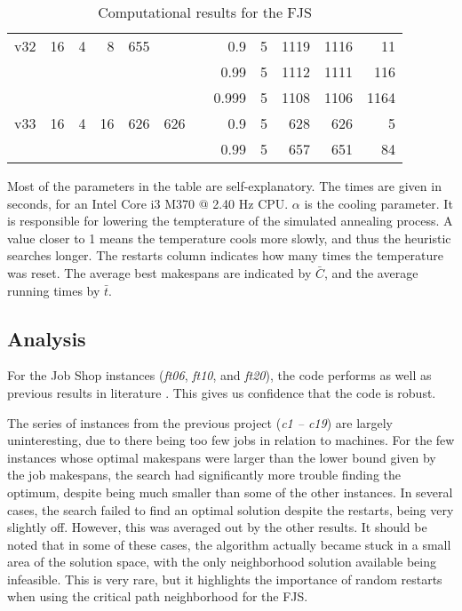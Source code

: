 \documentclass[a4paper,11pt]{article}
\begin{document}
\begin{table}
\begin{tabular}{@{\bfseries}rrrrrrrrrrrr}
	v32  & 16 &  4 &  8 &  655 &      &&    0.9 & 5 & 1119 & 1116 &   11 \\
	     &    &    &    &      &      &&   0.99 & 5 & 1112 & 1111 &  116 \\
	     &    &    &    &      &      &&  0.999 & 5 & 1108 & 1106 & 1164 \\
	v33  & 16 &  4 & 16 &  626 &  626 &&    0.9 & 5 &  628 &  626 &    5 \\
	     &    &    &    &      &      &&   0.99 & 5 &  657 &  651 &   84 \\
	\bottomrule
\end{tabular}
\caption{Computational results for the FJS}
\label{table:fjs}
\end{table}

Most of the parameters in the table are self-explanatory. The times are given in seconds, for an Intel Core i3 M370 @ 2.40 Hz CPU. $\alpha$ is the cooling parameter. It is responsible for lowering the tempterature of the simulated annealing process. A value closer to 1 means the temperature cools more slowly, and thus the heuristic searches longer. The restarts column indicates how many times the temperature was reset. The average best makespans are indicated by $\bar{C}$, and the average running times by $\bar{t}$.

\subsection{Analysis}

For the Job Shop instances (\emph{ft06}, \emph{ft10}, and \emph{ft20}), the code performs as well as previous results in literature \cite{simulatedannealingjsp}. This gives us confidence that the code is robust.

The series of instances from the previous project (\emph{c1 -- c19}) are largely uninteresting, due to there being too few jobs in relation to machines. For the few instances whose optimal makespans were larger than the lower bound given by the job makespans, the search had significantly more trouble finding the optimum, despite being much smaller than some of the other instances. In several cases, the search failed to find an optimal solution despite the restarts, being very slightly off. However, this was averaged out by the other results. It should be noted that in some of these cases, the algorithm actually became stuck in a small area of the solution space, with the only neighborhood solution available being infeasible. This is very rare, but it highlights the importance of random restarts when using the critical path neighborhood for the FJS.
\end{document}
